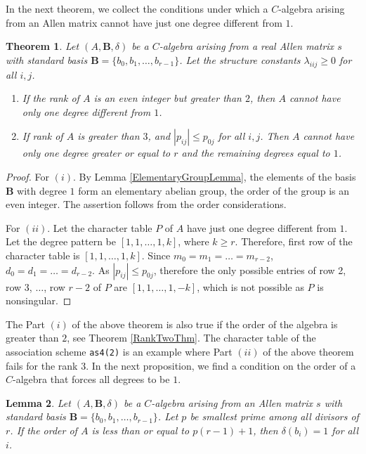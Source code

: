 \documentclass[12pt]{amsart}
\newtheorem{thm}{Theorem}
\newtheorem{lemma}[thm]{Lemma}
\begin{document}
In the next theorem, we collect the conditions under which a $C$-algebra arising from an Allen matrix cannot have just one degree different from $1$.

\begin{thm}\label{OneDegreeDifferentThm} Let $(A,{{\mathbf B}}, \delta)$ be a $C$-algebra arising from a real Allen matrix $s$ with standard basis ${{\mathbf B}}=\{b_0,b_1,\hdots, b_{r-1}\}$. Let the structure constants $\lambda_{iij}\geq 0$ for all $i,j$.
\begin{enumerate}
  \item If the rank of $A$ is an even integer but greater than $2$, then $A$ cannot have only one degree different from $1$.
  \item If rank of $A$ is greater than $3$, and  $|p_{ij}|\leq p_{0j}$ for all $i,j$. Then $A$ cannot have only one degree greater or equal to $r$ and the remaining degrees equal to $1$.
\end{enumerate}
\end{thm}

\begin{proof}  For $(i)$. By Lemma \ref{ElementaryGroupLemma}, the elements of the basis ${{\mathbf B}}$ with degree $1$ form an elementary abelian group, the order of the group is an even integer. The assertion follows from the order considerations.

\smallskip

For $(ii)$. Let the character table $P$ of $A$ have just one degree different from $1$. Let the degree pattern be  $[1,1, \hdots,1,k]$, where $k\geq r$. Therefore, first row of the character table is $[1,1, \hdots,1,k]$. Since $m_0=m_1=\hdots=m_{r-2}$, $d_0=d_1=\hdots=d_{r-2}$. As $|p_{ij}|\leq p_{0j}$, therefore the only possible entries of row 2, row 3, $\hdots$, row $r-2$ of $P$ are  $[1,1, \hdots,1,-k]$, which is not possible as  $P$  is nonsingular.
\end{proof}

The Part $(i)$ of the above theorem is also true if the order of the algebra is greater than $2$, see Theorem \ref{RankTwoThm}. The character table of the association scheme {\tt as4(2)} is an example where Part $(ii)$ of the above theorem fails for the rank $3$. In the next proposition, we find a condition on the order of a $C$-algebra that forces all degrees to be $1$. 

\begin{lemma}\label{OrderRankComparisionLemma}Let $(A,{{\mathbf B}}, \delta)$ be a $C$-algebra arising from an Allen matrix $s$ with standard  basis ${{\mathbf B}}=\{b_0,b_1,\hdots, b_{r-1}\}$.  Let $p$ be smallest prime among all divisors of $r$. If the order of $A$ is less than or equal to $p(r-1)+1$, then  $\delta(b_i)=1$ for all $i$.
\end{lemma}
\end{document}
